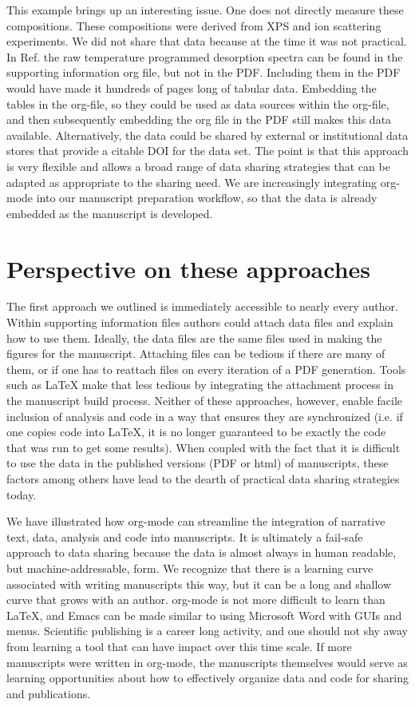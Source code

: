 \documentclass[journal=accacs,manuscript=article,email=true]{achemso}
\begin{document}
This example brings up an interesting issue. One does not directly measure these compositions. These compositions were derived from XPS and ion scattering experiments. We did not share that data because at the time it was not practical. In Ref.  the raw temperature programmed desorption spectra can be found in the supporting information org file, but not in the PDF. Including them in the PDF would have made it hundreds of pages long of tabular data. Embedding the tables in the org-file, so they could be used as data sources within the org-file, and then subsequently embedding the org file in the PDF still makes this data available. Alternatively, the data could be shared by external \cite{zenodo-zenod,figshare,the-datav-projec} or institutional data stores that provide a citable DOI for the data set. The point is that this approach is very flexible and allows a broad range of data sharing strategies that can be adapted as appropriate to the sharing need. We are increasingly integrating org-mode into our manuscript preparation workflow, so that the data is already embedded as the manuscript is developed.

\section{Perspective on these approaches}
\label{sec-4}
The first approach we outlined is immediately accessible to nearly every author. Within supporting information files authors could attach data files and explain how to use them. Ideally, the data files are the same files used in making the figures for the manuscript. Attaching files can be tedious if there are many of them, or if one has to reattach files on every iteration of a PDF generation. Tools such as \LaTeX{} make that less tedious by integrating the attachment process in the manuscript build process. Neither of these approaches, however, enable facile inclusion of analysis and code in a way that ensures they are synchronized (i.e. if one copies code into \LaTeX{}, it is no longer guaranteed to be exactly the code that was run to get some results). When coupled with the fact that it is difficult to use the data in the published versions (PDF or html) of manuscripts, these factors among others \cite{borgman-2012} have lead to the dearth of practical data sharing strategies today.

We have illustrated how org-mode can streamline the integration of narrative text, data, analysis and code into manuscripts. It is ultimately a fail-safe approach to data sharing because the data is almost always in human readable, but machine-addressable, form. We recognize that there is a learning curve associated with writing manuscripts this way, but it can be a long and shallow curve that grows with an author. org-mode is not more difficult to learn than \LaTeX{}, and Emacs can be made similar to using Microsoft Word with GUIs and menus. Scientific publishing is a career long activity, and one should not shy away from learning a tool that can have impact over this time scale. If more manuscripts were written in org-mode, the manuscripts themselves would serve as learning opportunities about how to effectively organize data and code for sharing and publications.
\end{document}
